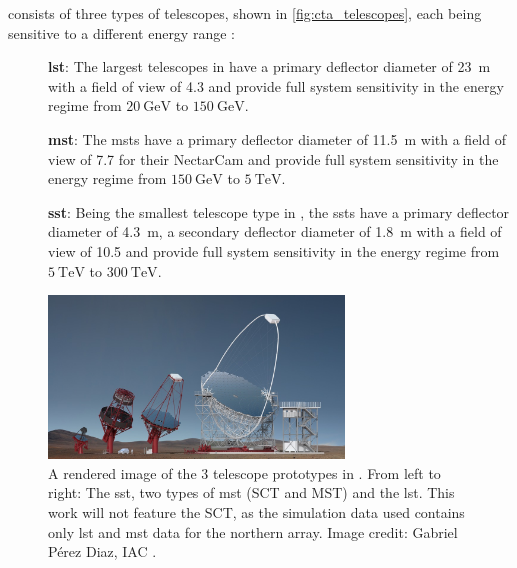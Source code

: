 \cta{} consists of three types of telescopes, shown in \autoref{fig:cta_telescopes}, each being
sensitive to a different energy range \cite{cta_specs}:
\begin{description}
    \item [] \textbf{\gls{lst}}: The largest telescopes in \cta{} have a primary deflector diameter
    of \SI{23}{\meter} with a field of view of \SI{4.3}{\deg} and provide full system sensitivity in the energy
    regime from \(\SI{20}{\giga\eV}\) to \(\SI{150}{\giga\eV}\).
    \item [] \textbf{\gls{mst}}: The \glspl{mst} have a primary deflector diameter of \SI{11.5}{\meter}
    with a field of view of \SI{7.7}{\deg} for their NectarCam and provide full system sensitivity in the energy
    regime from \(\SI{150}{\giga\eV}\) to \(\SI{5}{\tera\eV}\).
    \item [] \textbf{\gls{sst}}: Being the smallest telescope type in \cta{}, the \glspl{sst}
    have a primary deflector diameter of \SI{4.3}{\meter}, a secondary deflector diameter of
    \SI{1.8}{\meter} with a field of view of \SI{10.5}{\deg} and provide full system sensitivity in the energy
    regime from \(\SI{5}{\tera\eV}\) to \(\SI{300}{\tera\eV}\).
\end{description}

\begin{figure}
    \centering
    \includegraphics[width=0.7\textwidth]{graphics/telescopes_render.jpg}
    \caption{A rendered image of the 3 telescope prototypes in \cta{}. From left to right: The \gls{sst},
    two types of \gls{mst} (SCT and MST) and the \gls{lst}. This work will not feature the SCT, as
    the simulation data used contains only \gls{lst} and \gls{mst} data for the northern array.
    Image credit: Gabriel Pérez Diaz, IAC \cite{cta_tech}.}
    \label{fig:cta_telescopes}
\end{figure}

